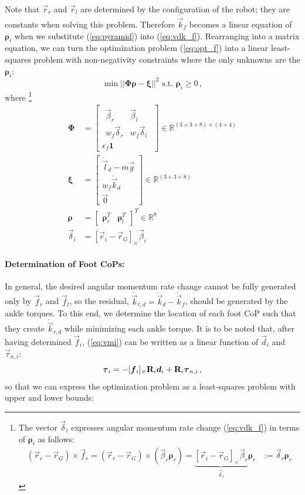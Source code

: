 \documentclass{llncs}
\newcommand{\skewsym}[1] {[#1]_{\times}}
\newcommand{\vrho} {\boldsymbol{\rho}}
\newcommand{\vxi} {\boldsymbol{\xi}}
\newcommand{\mPhi} {\boldsymbol{\Phi}}
\newcommand {\mat}[1] {{\bf #1}}
\newcommand{\mR} {\mat{R}}
\newcommand{\real} {\mathbb{R}}
\newcommand{\eye} {\mathbf{1}}
\newcommand{\vg}{\vec{g}}
\newcommand{\vr}{\vec{r}}
\newcommand{\vbeta}{\vec{\beta}}
\newcommand{\vdelta}{\vec{\delta}}
\newcommand{\vtau}{\vec{\tau}}
\newcommand{\vd}{\vec{d}}
\newcommand{\vf}{\vec{f}}
\newcommand{\vdk} {\dot{\vec{k}}}
\newcommand{\vdl} {\dot{\vec{l}}}
\begin{document}
Note that $\vr_r$ and $\vr_l$ are determined by the configuration of the robot; they are constants when solving this problem. Therefore $\vdk_f$ becomes a
linear equation of $\vrho_i$ when we substitute (\ref{eq:pyramid}) into (\ref{eq:vdk_f}).  %
Rearranging into a matrix equation, we can turn the optimization problem (\ref{eq:opt_f})  into a linear least-squares problem with non-negativity constraints where the only unknowns are the $\vrho_i$:
\begin{equation}
	\min || \mPhi \vrho - \vxi ||^2 \text{~s.t.~} \vrho_i \ge 0  \, ,\label{eq:nnls}
\end{equation}
where \footnote{
The vector $\vdelta_i$  expresses angular momentum
rate change (\ref{eq:vdk_f}) in terms of $\vrho_i$ as follows:
\begin{align*}
(\vr_r-\vr_G)\times\vf_r
= (\vr_r-\vr_G)\times \left(\vbeta_r \vrho_r \right)
= \underbrace{\skewsym{ {\vr_i-\vr_G} }\vbeta_r}_{\vdelta_r} \vrho_r
&:= \vdelta_r \vrho_r
\end{align*}}
\begin{align}
	\mPhi &= \begin{bmatrix}
	\begin{matrix}
	\vbeta_r & \vbeta_l \\
	w_f\vdelta_r & w_f\vdelta_l
	\end{matrix}
	\\
	\epsilon_f \eye
	\end{bmatrix}\in \real^{(3+3+8)\times(4+4)} \\ 	
	\vxi &= \begin{bmatrix} \vdl_d-m\vg \\  w_f\vdk_d \\ \vec{0} \end{bmatrix} \in \real^{(3+3+8)}\nonumber\\
	\vrho &= \begin{bmatrix} \vrho_r^T & \vrho_l^T \end{bmatrix}^T \in \real^{8}\\
	\vdelta_i &= \skewsym{ {\vr_i-\vr_G} }\vbeta_i
\end{align}

\paragraph{Determination of Foot CoPs:}
In general, the desired angular momentum rate change cannot be fully generated
only by $\vf_r$ and $\vf_l$, so the residual, $\vdk_{\tau,d} = \vdk_d - \vdk_f$,
should be generated by
the ankle torques. To this end, we determine the location of each foot CoP such that
they create $\vdk_{\tau,d}$ while minimizing each ankle torque.
It is to be noted that, after having determined $\vf_i$, (\ref{eq:vmi}) can be written
as a linear function of $\vd_i$ and $\vtau_{n,i}$:
\begin{equation}
	\vtau_i = -\skewsym{\vf_i} \mR_i\vd_i + \mR_i\vtau_{n,i} \, ,
	\label{eq:vm_r}
\end{equation}
so that we can express
the optimization problem as a least-squares problem with upper and lower
bounds:
\end{document}
